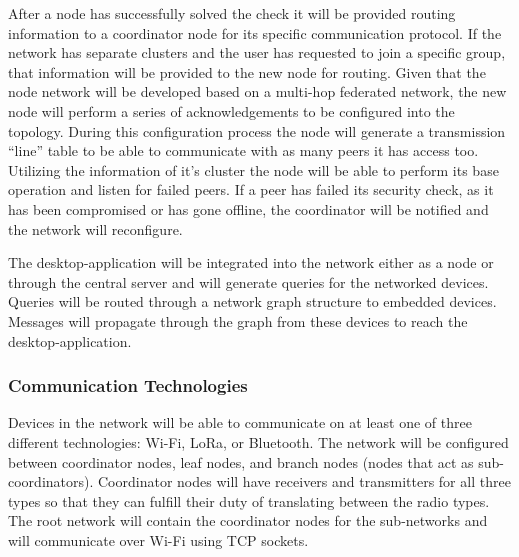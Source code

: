 \documentclass[tikz,a4paper,titlepage]{article}
\begin{document}
After a node has successfully solved the check it will be provided routing information to a coordinator node for its specific communication protocol. If the network has separate clusters and the user has requested to join a specific group, that information will be provided to the new node for routing. Given that the node network will be developed based on a multi-hop federated network, the new node will perform a series of acknowledgements to be configured into the topology. During this configuration process the node will generate a transmission “line” table to be able to communicate with as many peers it has access too. Utilizing the information of it’s cluster the node will be able to perform its base operation and listen for failed peers. If a peer has failed its security check, as it has been compromised or has gone offline, the coordinator will be notified and the network will reconfigure.

The desktop-application will be integrated into the network either as a node or through the central server and will generate queries for the networked devices. Queries will be routed through a network graph structure to embedded devices. Messages will propagate through the graph from these devices to reach the desktop-application.



\subsubsection{Communication Technologies}

Devices in the network will be able to communicate on at least one of three different technologies: Wi-Fi, LoRa, or Bluetooth.
The network will be configured between coordinator nodes, leaf nodes, and branch nodes (nodes that act as sub-coordinators). Coordinator nodes will have receivers and transmitters for all three types so that they can fulfill their duty of translating between the radio types. The root network will contain the coordinator nodes for the sub-networks and will communicate over Wi-Fi using TCP sockets.
\end{document}
